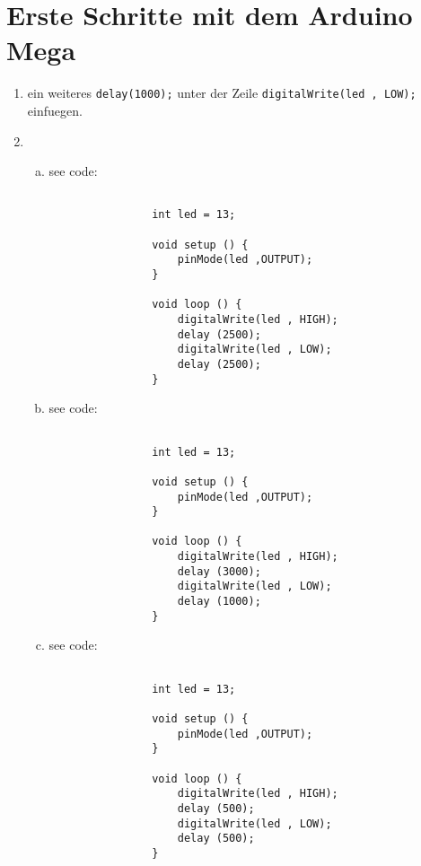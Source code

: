 \documentclass[12pt]{article}
\begin{document}
\lstset{language=C++}

\section{ Erste Schritte mit dem Arduino Mega}
\begin{enumerate}
    \item 
        ein weiteres \verb!delay(1000);! unter der Zeile \verb!digitalWrite(led , LOW);! einfuegen.
    \item
        \begin{enumerate}[a)]
            \item 
                see code:\\
                \begin{lstlisting}[frame=single]  % Start your code-block

                int led = 13;

                void setup () {
                    pinMode(led ,OUTPUT);
                }

                void loop () {
                    digitalWrite(led , HIGH);
                    delay (2500);
                    digitalWrite(led , LOW);
                    delay (2500);
                }
                \end{lstlisting}

            \item
                see code:\\
                \begin{lstlisting}[frame=single]  % Start your code-block

                int led = 13;

                void setup () {
                    pinMode(led ,OUTPUT);
                }

                void loop () {
                    digitalWrite(led , HIGH);
                    delay (3000);
                    digitalWrite(led , LOW);
                    delay (1000);
                }
                \end{lstlisting}


            \newpage
            \item
                see code:\\
                \begin{lstlisting}[frame=single]  % Start your code-block

                int led = 13;

                void setup () {
                    pinMode(led ,OUTPUT);
                }

                void loop () {
                    digitalWrite(led , HIGH);
                    delay (500);
                    digitalWrite(led , LOW);
                    delay (500);
                }
                \end{lstlisting}
                
        \end{enumerate}
\end{enumerate}
\end{document}
